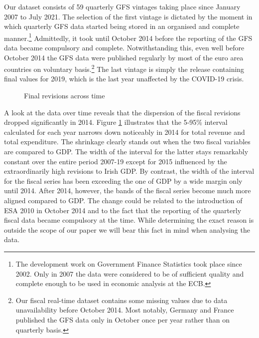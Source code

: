 Our dataset consists of 59 quarterly GFS vintages taking place since January 2007 to July 2021. The selection of the first vintage is dictated by the moment in which quarterly GFS data started being stored in an organised and complete manner.\footnote{The development work on Government Finance Statistics took place since 2002. Only in 2007 the data were considered to be of sufficient quality and complete enough to be used in economic analysis at the ECB.} Admittedly, it took until
October 2014 before the reporting of the GFS data became compulsory and complete. Notwithstanding this, even well before October 2014 the GFS data were published regularly by most of the euro area countries on voluntary basis.\footnote{Our fiscal real-time dataset contains some missing values due to data unavailability before October 2014. Most notably, Germany and France published the GFS data only in October once per year rather than on quarterly basis.} The last vintage is simply the release containing final values for 2019, which is the last year unaffected by the COVID-19 crisis.

\begin{figure}[H]
\begin{centering}
\caption{Final revisions across time \label{fig: revisions_over_time}}
\par\end{centering}
\centering

\end{figure}

A look at the data over time reveals that the dispersion of the fiscal 
revisions dropped significantly in 2014. Figure \ref{fig: revisions_over_time} 
illustrates that the 5-95\% interval calculated for each year narrows down 
noticeably in 2014 for total revenue and total expenditure. 
The shrinkage clearly stands out when the two fiscal variables are 
compared to GDP. The width of the interval for the latter 
stays remarkably constant over the entire period 2007-19 except for 2015 influenced by the extraordinarily high revisions to Irish GDP. By contrast, the width of the interval for the fiscal series has been exceeding the one of GDP by a wide margin only until 2014. After 2014, 
however, the bands of the fiscal series become much more aligned compared to 
GDP. The change could be related to the introduction of ESA 2010 in October 2014 and 
to the fact that the reporting of the quarterly fiscal data became compulsory 
at the time. While determining the exact reason is outside the scope of our 
paper we will bear this fact in mind when analysing the data.